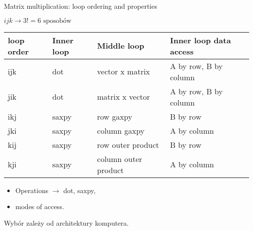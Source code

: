 \begin{frame}[fragile]{Matrix multiplication: loop ordering and properties}

$i j k \rightarrow 3! = 6 \text{ sposobów} $ \\

\vspace{5px}
\begin{tabular}{ |p{1cm}||p{1.6cm}||p{3.4cm}||p{3.7cm}|  }
 \hline

 loop order& Inner loop & Middle loop&Inner loop data access\\
 \hline
 ijk   & dot   &vector x matrix&   A by row, B by column\\
\hline
 jik&   dot & matrix x vector  &A by row, B by column\\
\hline
 ikj &saxpy & row gaxpy&  B by row\\
\hline
 jki    &saxpy & column gaxpy&  A by column\\
\hline
 kij &   saxpy  & row outer product& B by row\\
\hline
 kji& saxpy  & column outer product & A by column\\
 \hline
\end{tabular}

\begin{itemize}
\item Operations $\rightarrow$ dot, saxpy,
\item modes of access.
\end{itemize}

Wybór zależy od architektury komputera.
\end{frame}
